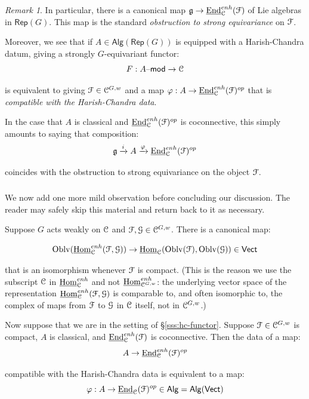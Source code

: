 \documentclass[reqno,11pt]{amsart}
\numberwithin{equation}{subsection}
\theoremstyle{remark}
\newtheorem{rem}[thm]{Remark}
\newcommand{\xar}[1]{\xrightarrow{#1}}
\newcommand{\sC}{{\EuScript C}}
\newcommand{\sF}{{\EuScript F}}
\newcommand{\sG}{{\EuScript G}}
\newcommand{\fg}{{\mathfrak g}}
\newcommand{\on}{\operatorname}
\newcommand{\ul}{\underline}
\newcommand{\mathendash}{\text{\textendash}}
\newcommand{\End}{\on{End}}
\newcommand{\Hom}{\on{Hom}}
\newcommand{\Rep}{\mathsf{Rep}}
\newcommand{\vph}{\varphi}
\newcommand{\Vect}{\mathsf{Vect}}
\renewcommand{\mod}{\mathendash\mathsf{mod}}
\newcommand{\Oblv}{\on{Oblv}}
\newcommand{\Alg}{\mathsf{Alg}}
\begin{document}
\begin{rem}

In particular, there is a canonical map 
$\fg \to \ul{\End}_{\sC}^{enh}(\sF)$ of Lie algebras in $\Rep(G)$.
This map is the standard \emph{obstruction to strong equivariance}
on $\sF$.

\end{rem}

Moreover, we see that if $A \in \Alg(\Rep(G))$ is equipped with a Harish-Chandra
datum, giving a strongly $G$-equivariant functor:
%
\[
F:A\mod \to \sC
\]

\noindent is equivalent to giving $\sF \in \sC^{G,w}$ and
a map $\vph:A \to \ul{\End}_{\sC}^{enh}(\sF)^{op}$ that is
\emph{compatible with the Harish-Chandra data}.

In the case that $A$ is classical and $\ul{\End}_{\sC}^{enh}(\sF)^{op}$ 
is coconnective, this simply amounts to saying that composition:
%
\[
\fg \xar{i} A \xar{\vph} \ul{\End}_{\sC}^{enh}(\sF)^{op}
\]

\noindent coincides with the obstruction to strong equivariance on the object $\sF$.

\subsubsection{}\label{sss:connected-obstr}

We now add one more mild observation before concluding our discussion. The
reader may safely skip this material and return back to it as necessary.

Suppose $G$ acts weakly on $\sC$ and $\sF,\sG \in \sC^{G,w}$.
There is a canonical map:

\[
\Oblv(\ul{\Hom}_{\sC}^{enh}(\sF,\sG)) \to \ul{\Hom}_{\sC}(\Oblv(\sF),\Oblv(\sG))
\in \Vect
\]

\noindent that is an isomorphism whenever $\sF$ is compact. (This is the
reason we use the subscript $\sC$ in $\ul{\Hom}_{\sC}^{enh}$ and
not $\ul{\Hom}_{\sC^{G,w}}^{enh}$: the underlying vector space
of the representation $\ul{\Hom}_{\sC}^{enh}(\sF,\sG)$ is 
comparable to, and often isomorphic to, the complex of maps
from $\sF$ to $\sG$ in $\sC$ itself, not in $\sC^{G,w}$.)

Now suppose that we are in the setting of \S \ref{sss:hc-functor}.
Suppose $\sF \in \sC^{G,w}$ is compact, $A$ is classical, and
$\ul{\End}_{\sC}^{enh}(\sF)$ is coconnective. Then the data
of a map:
%
\[
A \to \ul{\End}_{\sC}^{enh}(\sF)^{op}
\]

\noindent compatible with the Harish-Chandra data is equivalent to 
a map:
% 
\[
\vph:A \to  \ul{\End}_{\sC}(\sF)^{op} \in \Alg = \Alg(\Vect)
\]
\end{document}
